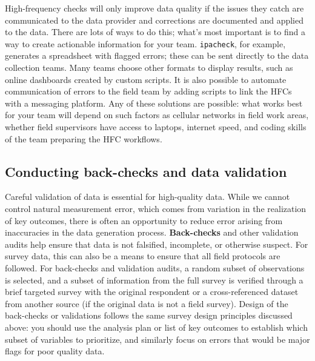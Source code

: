 High-frequency checks will only improve data quality
if the issues they catch are communicated to the data provider
and corrections are documented and applied to the data.
There are lots of ways to do this;
what's most important is to find a way to create actionable information for your team.
\texttt{ipacheck}, for example, generates a spreadsheet with flagged errors;
these can be sent directly to the data collection teams.
Many teams choose other formats to display results,
such as online dashboards created by custom scripts.
It is also possible to automate communication of errors to the field team
by adding scripts to link the HFCs with a messaging platform.
Any of these solutions are possible:
what works best for your team will depend on such factors as
cellular networks in field work areas, whether field supervisors have access to laptops,
internet speed, and coding skills of the team preparing the HFC workflows.

\subsection{Conducting back-checks and data validation}

Careful validation of data is essential for high-quality data.
While we cannot control natural measurement error,
which comes from variation in the realization of key outcomes,
there is often an opportunity to reduce error arising from inaccuracies in the data generation process.
\textbf{Back-checks} and
other validation audits help ensure that data is not falsified, incomplete, or otherwise suspect.
For survey data, this can also be a means to ensure that all field protocols are followed.
For back-checks and validation audits, a random subset of observations is selected,
and a subset of information from the full survey is
verified through a brief targeted survey with the original respondent
or a cross-referenced dataset from another source (if the original data is not a field survey).
Design of the back-checks or validations follows the same survey design
principles discussed above: you should use the analysis plan
or list of key outcomes to establish which subset of variables to prioritize,
and similarly focus on errors that would be major flags for poor quality data.


